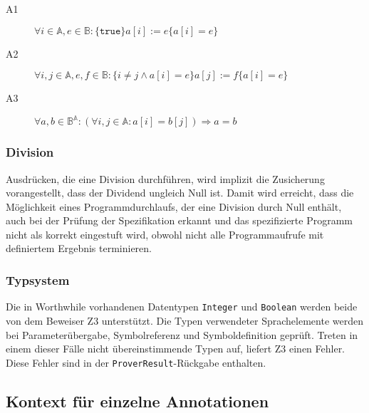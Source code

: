 \begin{description}%
    \item[A1] \begin{math}\forall i \in \mathbb{A}, e \in \mathbb{B} : \{\texttt{true}\} a[i] := e \{a[i] = e\}\end{math}%
    \item[A2] \begin{math}\forall i, j \in \mathbb{A}, e, f \in \mathbb{B} : \{i \neq j \wedge a[i] = e\} a[j] := f \{a[i] = e\}\end{math}%
    \item[A3] \begin{math}\forall a, b \in \mathbb{B}^\mathbb{A} : (\forall i, j \in \mathbb{A} : a[i] = b[j]) \Rightarrow a = b\end{math}%
\end{description}%

\subsubsection{Division}%

Ausdrücken, die eine Division durchführen, wird implizit die Zusicherung
vorangestellt, dass der Dividend ungleich Null ist. Damit wird erreicht, dass
die Möglichkeit eines Programmdurchlaufs, der eine Division durch Null enthält,
auch bei der Prüfung der Spezifikation erkannt und das spezifizierte Programm
nicht als korrekt eingestuft wird, obwohl nicht alle Programmaufrufe mit
definiertem Ergebnis terminieren.%

\subsubsection{Typsystem}%

Die in Worthwhile vorhandenen Datentypen \texttt{Integer} und
\texttt{Boolean} werden beide von dem Beweiser Z3 unterstützt. Die Typen verwendeter Sprachelemente
werden bei Parameterübergabe, Symbolreferenz und Symboldefinition
geprüft. Treten in einem dieser Fälle nicht übereinstimmende Typen auf, liefert Z3 einen
Fehler. Diese Fehler sind in der \texttt{ProverResult}-Rückgabe enthalten.%

\subsection{Kontext für einzelne Annotationen}%


